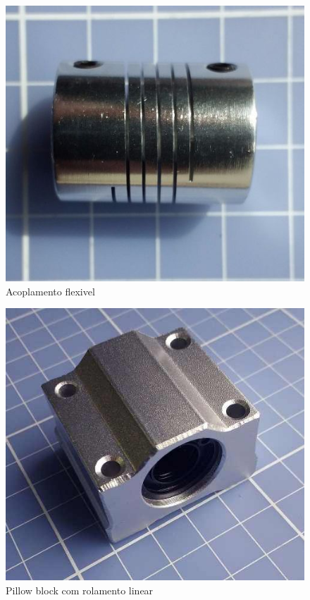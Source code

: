 \begin{figure}[!h]
	\centering
		\includegraphics[scale=0.2]{figuras/estrutura/5-Acoplamento-flexivel.jpg}
	\caption{Acoplamento flexivel}
\end{figure}

\begin{figure}[!h]
	\centering
		\includegraphics[scale=0.2]{figuras/estrutura/6-Pillow-block-com-rolamento-linear.jpg}
	\caption{Pillow block com rolamento linear}
\end{figure}

